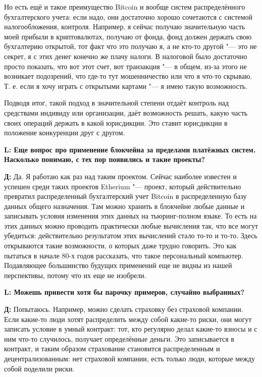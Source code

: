 \documentclass[10pt, a5paper]{article}
\begin{document}
Но есть ещё и такое преимущество Bitcoin и вообще систем распределённого бухгалтерского учета: если надо, они достаточно хорошо сочетаются с системой налогообложения, контроля. Например, я сейчас получаю значительную часть моей прибыли в криптовалютах, получаю от фонда, фонд должен держать свою бухгалтерию открытой, тот факт что это получаю я, а не кто-то другой "--- это не секрет, я с этих денег конечно же плачу налоги. В налоговой было достаточно просто показать, что вот этот счет, вот транзакция "---  в общем, из-за этого не возникает подозрений, что где-то тут мошенничество или что я что-то скрываю. Т. е. если я хочу играть с открытыми картами "--- я имею такую возможность.

Подводя итог,  такой подход в значительной степени отдаёт контроль над средствами индивиду или организации, даёт возможность решать, какую часть своих операций держать в какой юрисдикции. Это ставит юрисдикции в положение конкуренции друг с другом.


{\noindent \bf L: Еще вопрос про применение блокчейна за пределами платёжных систем. Насколько понимаю, с тех пор появились и такие проекты?}

{\noindent \bf Д:} Да. Я работаю как раз над таким проектом. Сейчас наиболее известен и успешен среди таких проектов Etherium "--- проект, который действительно превратил распределенный бухгалтерский учет Bitcoin в распределенную базу данных общего назначения. Там можно хранить в блокчейне любые данные и записывать условия изменения этих данных на тьюринг-полном языке.
 То есть на этих данных можно проводить практически любые вычисления так, что все могут убедиться: действительно результатом этих вычислений стало то-то и то-то. Здесь открываются такие возможности, о которых даже трудно говорить. Это как пытаться в начале 80-х годов рассказать, что такое персональный компьютер. Подавляющее большинство будущих применений еще не видны из нашей перспективы, потому что их еще не изобрели.

{\noindent \bf L: Можешь привести хотя бы парочку примеров, случайно выбранных?}

{\noindent \bf Д:} Попытаюсь. Например, можно сделать страховку без страховой компании. Если какие-то люди хотят распределить между собой какие-то риски, они могут записать условие в умный контракт: тот, кто регулярно делал какие-то взносы и с ним что-то случилось, получает определённые деньги. Это записывается в контракт, и таким образом страхование становится распределенным и децентрализованным: нет страховой компании, есть только люди, которые между собой поделили риски. 
\end{document}
